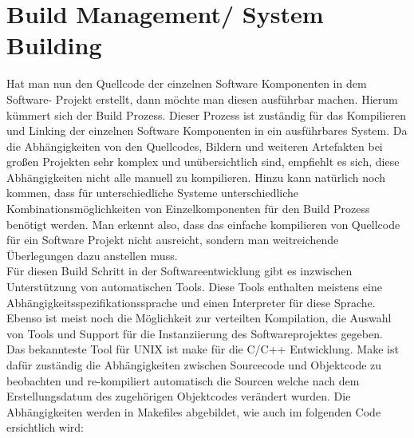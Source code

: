 \chapter{Build Management/ System Building}

Hat man nun den Quellcode der einzelnen Software Komponenten in dem Software- Projekt erstellt, dann möchte man diesen ausführbar machen. Hierum kümmert sich der Build Prozess. Dieser Prozess ist zuständig für das Kompilieren und Linking der einzelnen Software Komponenten in ein ausführbares System. Da die Abhängigkeiten von den Quellcodes, Bildern und weiteren Artefakten bei großen Projekten sehr komplex und unübersichtlich sind, empfiehlt es sich, diese Abhängigkeiten nicht alle manuell zu kompilieren. Hinzu kann natürlich noch kommen, dass für unterschiedliche Systeme unterschiedliche Kombinationsmöglichkeiten von Einzelkomponenten für den Build Prozess benötigt werden. Man erkennt also, dass das einfache kompilieren von Quellcode für ein Software Projekt nicht ausreicht, sondern man weitreichende Überlegungen dazu anstellen muss.
\\
Für diesen Build Schritt in der Softwareentwicklung gibt es inzwischen Unterstützung von automatischen Tools. 
Diese Tools enthalten meistens eine Abhängigkeitsspezifikationssprache und einen Interpreter für  diese Sprache. Ebenso ist meist noch die Möglichkeit zur verteilten Kompilation, die Auswahl von Tools und Support für die Instanziierung des Softwareprojektes gegeben. 
\\
Das bekannteste Tool für UNIX ist make für die C/C++ Entwicklung. Make ist dafür zuständig die Abhängigkeiten zwischen Sourcecode und Objektcode zu beobachten und re-kompiliert automatisch die Sourcen welche nach dem Erstellungsdatum des zugehörigen Objektcodes verändert wurden. Die Abhängigkeiten werden in Makefiles abgebildet, wie auch im folgenden Code ersichtlich wird:




